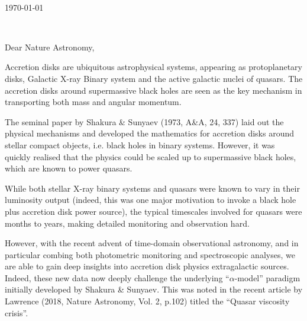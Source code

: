 \documentclass[11pt,a4paper]{letter} %
\def\opening#1{\thispagestyle{empty}
{\centering\fromaddress \vspace{0.6in} \\ %
\hspace*{\longindentation}\today\hspace*{\fill}\par} %
{\raggedright \toname \\ \toaddress \par} %
\vspace{0.25in} %
\noindent #1 %

}
\begin{document}

\begin{letter}
{
}


\vspace{-10pt}
\opening{Dear Nature Astronomy,}


Accretion disks are ubiquitous astrophysical systems, appearing as
protoplanetary disks, Galactic X-ray Binary system and the active
galactic nuclei of quasars.  The accretion disks around supermassive
black holes are seen as the key mechanism in transporting both mass
and angular momentum.

The seminal paper by Shakura \& Sunyaev (1973, A\&A, 24, 337) laid out
the physical mechanisms and developed the mathematics for accretion
disks around stellar compact objects, i.e. black holes in binary
systems.  However, it was quickly realised that the physics could be
scaled up to supermassive black holes, which are known to power
quasars.

While both stellar X-ray binary systems and quasars were known to vary
in their luminosity output (indeed, this was one major motivation to
invoke a black hole plus accretion disk power source), the typical
timescales involved for quasars were months to years, making detailed
monitoring and observation hard.

However, with the recent advent of time-domain observational
astronomy, and in particular combing both photometric monitoring and
spectroscopic analyses, we are able to gain deep insights into
accretion disk physics extragalactic sources. 
Indeed, these new data now deeply challenge the underlying
``$\alpha$-model'' paradigm initially developed by Shakura \&
Sunyaev. This was noted in the recent article by Lawrence (2018,
Nature Astronomy, Vol. 2, p.102) titled the ``Quasar viscosity
crisis''.


\end{letter}
\end{document}

